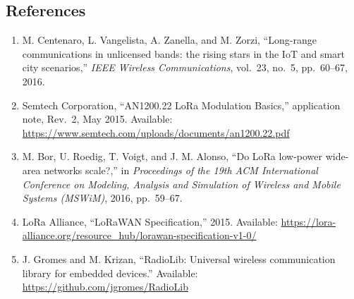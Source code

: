 \documentclass[letterpaper,twocolumn,10pt]{article}
\begin{document}
\subsection*{References}
\begin{enumerate}
\item M. Centenaro, L. Vangelista, A. Zanella, and M. Zorzi, ``Long-range communications in unlicensed bands: the rising stars in the IoT and smart city scenarios,'' \emph{IEEE Wireless Communications}, vol.~23, no.~5, pp.~60--67, 2016.
\item Semtech Corporation, ``AN1200.22 LoRa Modulation Basics,'' application note, Rev.~2, May 2015. Available: \url{https://www.semtech.com/uploads/documents/an1200.22.pdf}
\item M. Bor, U. Roedig, T. Voigt, and J. M. Alonso, ``Do LoRa low-power wide-area networks scale?,'' in \emph{Proceedings of the 19th ACM International Conference on Modeling, Analysis and Simulation of Wireless and Mobile Systems (MSWiM)}, 2016, pp.~59--67.
\item LoRa Alliance, ``LoRaWAN Specification,'' 2015. Available: \url{https://lora-alliance.org/resource_hub/lorawan-specification-v1-0/}
\item J. Gromes and M. Krizan, ``RadioLib: Universal wireless communication library for embedded devices.'' Available: \url{https://github.com/jgromes/RadioLib}
\end{enumerate}
\end{document}
